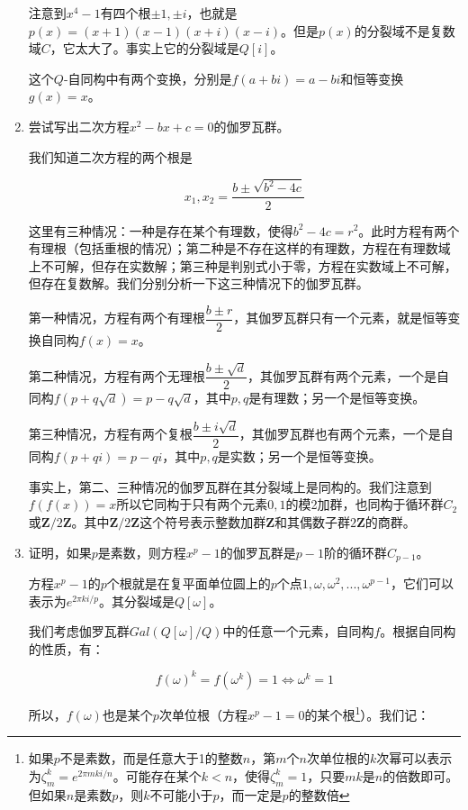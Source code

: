 \documentclass[UTF8]{article}
\begin{document}
\begin{enumerate}
注意到$x^4 -1$有四个根$\pm 1, \pm i$，也就是$p(x) = (x + 1)(x - 1)(x + i)( x - i)$。但是$p(x)$的分裂域不是复数域$C$，它太大了。事实上它的分裂域是$Q[i]$。

这个$Q$-自同构中有两个变换，分别是$f(a + bi) = a - bi$和恒等变换$g(x) = x$。

\item {尝试写出二次方程$x^2 - bx + c = 0$的伽罗瓦群。}

我们知道二次方程的两个根是

\[
x_1, x_2 = \dfrac{b \pm \sqrt{b^2 - 4c}}{2}
\]

这里有三种情况：一种是存在某个有理数，使得$b^2 - 4c = r^2$。此时方程有两个有理根（包括重根的情况）；第二种是不存在这样的有理数，方程在有理数域上不可解，但存在实数解；第三种是判别式小于零，方程在实数域上不可解，但存在复数解。我们分别分析一下这三种情况下的伽罗瓦群。

第一种情况，方程有两个有理根$\dfrac{b \pm r}{2}$，其伽罗瓦群只有一个元素，就是恒等变换自同构$f(x) = x$。

第二种情况，方程有两个无理根$\dfrac{b \pm \sqrt{d}}{2}$，其伽罗瓦群有两个元素，一个是自同构$f(p + q \sqrt{d}) = p - q \sqrt{d}$，其中$p, q$是有理数；另一个是恒等变换。

第三种情况，方程有两个复根$\dfrac{b \pm i \sqrt{d}}{2}$，其伽罗瓦群也有两个元素，一个是自同构$f(p + q i) = p - q i$，其中$p, q$是实数；另一个是恒等变换。

事实上，第二、三种情况的伽罗瓦群在其分裂域上是同构的。我们注意到$f(f(x)) = x$所以它同构于只有两个元素${0, 1}$的模2加群，也同构于循环群$C_2$或$\pmb{Z}/2\pmb{Z}$。其中$\pmb{Z}/2\pmb{Z}$这个符号表示整数加群$\pmb{Z}$和其偶数子群$2\pmb{Z}$的商群。

\item {证明，如果$p$是素数，则方程$x^p - 1$的伽罗瓦群是$p-1$阶的循环群$C_{p-1}$。}

方程$x^p -1$的$p$个根就是在复平面单位圆上的$p$个点$1, \omega, \omega^2, ..., \omega^{p-1}$，它们可以表示为$e^{2 \pi k i / p}$。其分裂域是$Q[\omega]$。

我们考虑伽罗瓦群$Gal(Q[\omega]/Q)$中的任意一个元素，自同构$f$。根据自同构的性质，有：

\[
f(\omega)^k = f(\omega^k) = 1 \iff \omega^k = 1
\]

所以，$f(\omega)$也是某个$p$次单位根（方程$x^p - 1 = 0$的某个根\footnote{如果$p$不是素数，而是任意大于1的整数$n$，第$m$个$n$次单位根的$k$次幂可以表示为$\zeta_m^k = e^{2 \pi m k i / n}$。可能存在某个$k < n$，使得$\zeta_m^k = 1$，只要$mk$是$n$的倍数即可。但如果$n$是素数$p$，则$k$不可能小于$p$，而一定是$p$的整数倍}）。我们记：


\end{enumerate}
\end{document}
